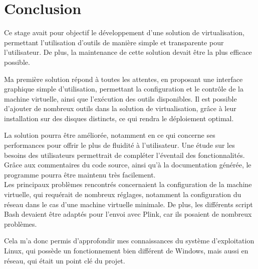 \cleardoublepage



\chapter*{Conclusion}

Ce stage avait pour objectif le développement d'une solution de virtualisation, permettant l'utilisation d'outils de manière simple et transparente pour l'utilisateur.
De plus, la maintenance de cette solution devait être la plus efficace possible.

Ma première solution répond à toutes les attentes, en proposant une interface graphique simple d'utilisation, permettant la configuration et le contrôle de la machine virtuelle, ainsi que l'exécution des outils disponibles.
Il est possible d'ajouter de nombreux outils dans la solution de virtualisation, grâce à leur installation sur des disques distincts, ce qui rendra le déploiement optimal.

La solution pourra être améliorée, notamment en ce qui concerne ses performances pour offrir le plus de fluidité à l'utilisateur.
Une étude sur les besoins des utilisateurs permettrait de compléter l'éventail des fonctionnalités.
Grâce aux commentaires du code source, ainsi qu'à la documentation générée, le programme pourra être maintenu très facilement.
\\


Les principaux problèmes rencontrés concernaient la configuration de la machine virtuelle, qui requérait de nombreux réglages, notamment la configuration du réseau dans le cas d'une machine virtuelle minimale.
De plus, les différents script Bash devaient être adaptés pour l'envoi avec Plink, car ils posaient de nombreux problèmes.

Cela m'a donc permis d'approfondir mes connaissances du système d'exploitation Linux, qui possède un fonctionnement bien différent de Windows, mais aussi en réseau, qui était un point clé du projet.
